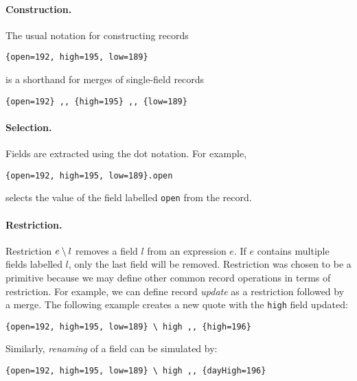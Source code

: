 \paragraph{Construction.} The usual notation for constructing records
\begin{lstlisting}
{open=192, high=195, low=189} 
\end{lstlisting}
is a shorthand for merges of single-field records
\begin{lstlisting}
{open=192} ,, {high=195} ,, {low=189} 
\end{lstlisting}

\paragraph{Selection.}
Fields are extracted using the dot notation. For example,
\begin{lstlisting}
{open=192, high=195, low=189}.open
\end{lstlisting}
selects the value of the field labelled \lstinline{open} from the record.

\paragraph{Restriction.}
Restriction $e \setminus l$ removes a field $l$ from an expression $e$. If $e$
contains multiple fields labelled $l$, only the last field will be removed.
Restriction was chosen to be a primitive because we may define other common
record operations in terms of restriction. For example, we can define record
\emph{update} as a restriction followed by a merge. The following example
creates a new quote with the \lstinline{high} field updated:
\begin{lstlisting}
{open=192, high=195, low=189} \ high ,, {high=196} 
\end{lstlisting}
Similarly, \emph{renaming} of a field can be simulated by:
\begin{lstlisting}
{open=192, high=195, low=189} \ high ,, {dayHigh=196} 
\end{lstlisting}

\begin{comment}
Refinement of fields is also possible, in the sense
that the type of a new value can be a subtype of that of the old
one.~\footnote{The subtyping restriction is not required for the \name to be
  coherent and it leaves option open for language designers.}
\bruno{Are we going to show an example of this?}
\end{comment}

